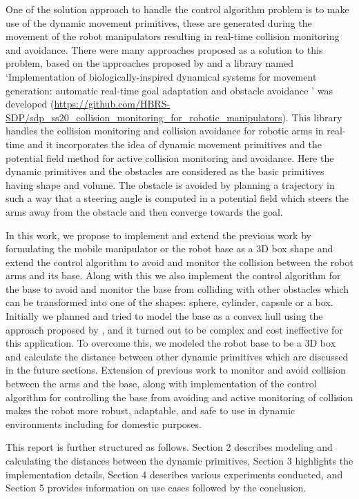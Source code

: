 \documentclass[a4paper, 11.5pt, conference]{ieeeconf}      %
\begin{document}
One of the solution approach to handle the control algorithm problem is to make use of the dynamic movement primitives, these are generated during the movement of the robot manipulators resulting in real-time collision monitoring and avoidance. There were many approaches proposed as a solution to this problem, based on the approaches proposed by \cite{Hoffmann} and \cite{Khatib} a library named `Implementation of biologically-inspired dynamical systems for
movement generation: automatic real-time goal adaptation and obstacle avoidance \cite{sdpss20}' was developed (\url{https://github.com/HBRS-SDP/sdp\_ss20\_collision\_monitoring\_for\_robotic\_manipulators}). This library handles the collision monitoring and collision avoidance for robotic arms in real-time and it incorporates the idea of dynamic movement primitives and the potential field method for active collision monitoring and avoidance. Here the dynamic primitives and the obstacles are considered as the basic primitives having shape and volume. The obstacle is avoided by planning a trajectory in such a way that a steering angle is computed in a potential field which steers the arms away from the obstacle and then converge towards the goal.

In this work, we propose to implement and extend the previous work by formulating the mobile manipulator or the robot base as a 3D box shape and extend the control algorithm to avoid and monitor the collision between the robot arms and its base. Along with this we also implement the control algorithm for the base to avoid and monitor the base from colliding with other obstacles which can be transformed into one of the shapes: sphere, cylinder, capsule or a box. Initially we planned and tried to model the base as a convex hull using the approach proposed by \cite{GJK}, and it turned out to be complex and cost ineffective for this application. To overcome this, we modeled the robot base to be a 3D box and calculate the distance between other dynamic primitives which are discussed in the future sections. Extension of previous work to monitor and avoid collision between the arms and the base, along with implementation of the control algorithm for controlling the base from avoiding and active monitoring of collision makes the robot more robust, adaptable, and safe to use in dynamic environments including for domestic purposes.

This report is further structured as follows. Section 2 describes modeling and  calculating the distances between the dynamic primitives, Section 3 highlights the implementation details, Section 4 describes various experiments conducted, and Section 5 provides information on use cases followed by the conclusion.
\end{document}

